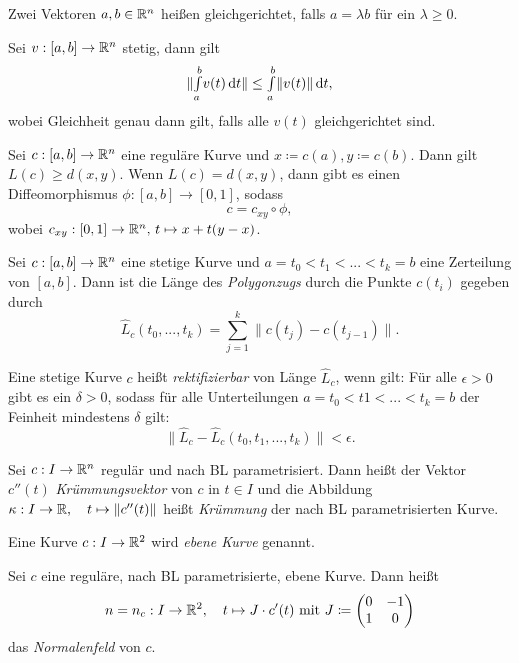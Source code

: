 \documentclass{cheat-sheet}
\newcommand{\Intabdt}[1]{\Int{a}{b}{#1}{t}}
\let\mySum\sum
\DeclareMathOperator*{\textsum}{{\textstyle \mySum}}
\renewcommand{\sum}{\textsum\limits}
\begin{document}
\begin{defn}
  Zwei Vektoren $a, b \in \mathbb{R}^n$ heißen gleichgerichtet, falls $a = \lambda b$ für ein $\lambda \geq 0$.
\end{defn}

\begin{satz}
  Sei $v : [a, b] \to \mathbb{R}^n$ stetig, dann gilt
  \[ \| \Intabdt{v(t)} \| \leq \Intabdt{\|v(t)\|}, \]
  wobei Gleichheit genau dann gilt, falls alle $v(t)$ gleichgerichtet sind.
\end{satz}

\begin{satz}
  Sei $c : [a, b] \to \mathbb{R}^n$ eine reguläre Kurve und $x \coloneqq c(a), y \coloneqq c(b)$. Dann gilt $L(c) \geq d(x, y)$. Wenn $L(c) = d(x, y)$, dann gibt es einen Diffeomorphismus $\phi : [a, b] \to [0, 1]$, sodass
  \[ c = c_{xy} \circ \phi, \]
  wobei $c_{xy} : [0, 1] \to \mathbb{R}^n,\,t \mapsto x + t (y - x)$.
\end{satz}


\begin{defn}
  Sei $c : [a, b] \to \mathbb{R}^n$ eine stetige Kurve und $a = t_0 < t_1 < ... < t_k = b$ eine Zerteilung von $[a, b]$. Dann ist die Länge des \emph{Polygonzugs} durch die Punkte $c(t_i)$ gegeben durch
  \[ \hat{L}_c(t_0, ..., t_k) = \sum_{j=1}^k \| c(t_j) - c(t_{j-1}) \|. \]
\end{defn}

\begin{defn}
  Eine stetige Kurve $c$ heißt \emph{rektifizierbar} von Länge $\hat{L}_c$, wenn gilt: Für alle $\epsilon > 0$ gibt es ein $\delta > 0$, sodass für alle Unterteilungen $a = t_0 < t1 < ... < t_k = b$ der Feinheit mindestens $\delta$ gilt:
  \[ \| \hat{L}_c - \hat{L}_c(t_0, t_1, ..., t_k) \| < \epsilon. \]
\end{defn}

\begin{defn}
  Sei $c : I \to \mathbb{R}^n$ regulär und nach BL parametrisiert. Dann heißt der Vektor $c''(t)$ \emph{Krümmungsvektor} von $c$ in $t \in I$ und die Abbildung $\kappa : I \to \mathbb{R}, \quad t \mapsto \| c''(t) \|$ heißt \emph{Krümmung} der nach BL parametrisierten Kurve.
\end{defn}

\begin{defn}
  Eine Kurve $c : I \to \mathbb{R}^2$ wird \emph{ebene Kurve} genannt.
\end{defn}

\begin{defn}
  Sei $c$ eine reguläre, nach BL parametrisierte, ebene Kurve. Dann heißt
  \[ n = n_c : I \to \mathbb{R}^2, \quad t \mapsto J \cdot c'(t) \text{ mit } J \coloneqq \begin{pmatrix} 0 & -1 \\ 1 & 0 \end{pmatrix}  \]
  das \emph{Normalenfeld} von $c$.
\end{defn}
\end{document}
